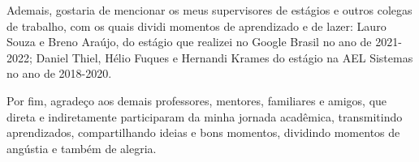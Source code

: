 Ademais, gostaria de mencionar os meus supervisores de estágios e outros colegas de trabalho, com os quais dividi momentos de aprendizado e de lazer: Lauro Souza e Breno Araújo, do estágio que realizei no Google Brasil no ano de 2021-2022; Daniel Thiel, Hélio Fuques e Hernandi Krames do estágio na AEL Sistemas no ano de 2018-2020.

Por fim, agradeço aos demais professores, mentores, familiares e amigos, que direta e indiretamente participaram da minha jornada acadêmica, transmitindo aprendizados, compartilhando ideias e bons momentos, dividindo momentos de angústia e também de alegria.

\clearpage
